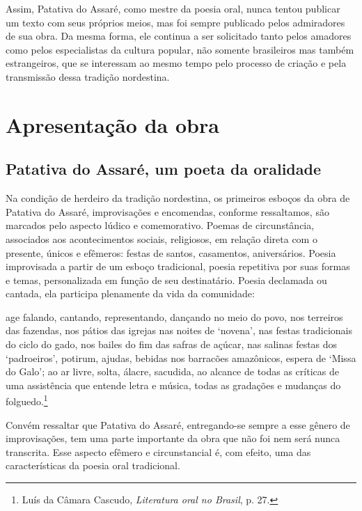 \noindent Assim, Patativa do Assaré, como mestre da poesia oral, nunca
tentou publicar um texto com seus próprios meios, mas foi sempre publicado pelos
admiradores de sua obra. Da mesma forma, ele continua a ser solicitado tanto
pelos amadores como pelos especialistas da cultura popular, não somente
brasileiros mas também estrangeiros, que se interessam ao mesmo tempo pelo
processo de criação e pela transmissão dessa tradição nordestina.

\section{Apresentação da obra}

\subsection{Patativa do Assaré, um poeta da oralidade}

Na condição de herdeiro da tradição nordestina, os primeiros esboços da obra de
Patativa do Assaré, improvisações e encomendas, conforme ressaltamos, são
marcados pelo aspecto lúdico e comemorativo. Poemas de circunstância, associados
aos acontecimentos sociais, religiosos, em relação direta com o presente, únicos
e efêmeros: festas de santos, casamentos, aniversários. Poesia improvisada a
partir de um esboço tradicional, poesia repetitiva por suas formas e temas,
personalizada em função de seu destinatário. Poesia declamada ou cantada, ela
participa plenamente da vida da comunidade:

\begin{hedraquote}
age falando, cantando,
representando, dançando no meio do povo, nos terreiros das fazendas, nos pátios
das igrejas nas noites de ‘novena’, nas festas tradicionais do ciclo do gado,
nos bailes do fim das safras de açúcar, nas salinas festas dos ‘padroeiros’,
potirum, ajudas, bebidas nos barracões amazônicos, espera de ‘Missa do Galo’; ao
ar livre, solta, álacre, sacudida, ao alcance de todas as críticas de uma
assistência que entende letra e música, todas as gradações e mudanças do
folguedo.\footnote{ Luís da Câmara Cascudo, \textit{Literatura oral no Brasil},
p. 27.}
\end{hedraquote}

\noindent Convém ressaltar que Patativa do Assaré, entregando-se sempre a esse
gênero de improvisações, tem uma parte importante da obra que não foi nem será
nunca transcrita. Esse aspecto efêmero e circunstancial é, com efeito, uma das
características da poesia oral tradicional.

